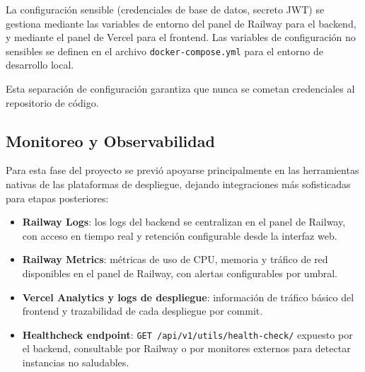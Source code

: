 La configuración sensible (credenciales de base de datos, secreto JWT) se gestiona mediante las variables de entorno del panel de Railway para el backend, y mediante el panel de Vercel para el frontend. Las variables de configuración no sensibles se definen en el archivo \texttt{docker-compose.yml} para el entorno de desarrollo local.

Esta separación de configuración garantiza que nunca se cometan credenciales al repositorio de código.

\subsection{Monitoreo y Observabilidad}\label{monitoreo-y-observabilidad}

Para esta fase del proyecto se previó apoyarse principalmente en las herramientas nativas de las plataformas de despliegue, dejando integraciones más sofisticadas para etapas posteriores:

\begin{itemize}
\tightlist
\item
  \textbf{Railway Logs}: los logs del backend se centralizan en el panel de Railway, con acceso en tiempo real y retención configurable desde la interfaz web.
\item
  \textbf{Railway Metrics}: métricas de uso de CPU, memoria y tráfico de red disponibles en el panel de Railway, con alertas configurables por umbral.
\item
  \textbf{Vercel Analytics y logs de despliegue}: información de tráfico básico del frontend y trazabilidad de cada despliegue por commit.
\item
  \textbf{Healthcheck endpoint}: \texttt{GET\ /api/v1/utils/health-check/} expuesto por el backend, consultable por Railway o por monitores externos para detectar instancias no saludables.
\end{itemize}
